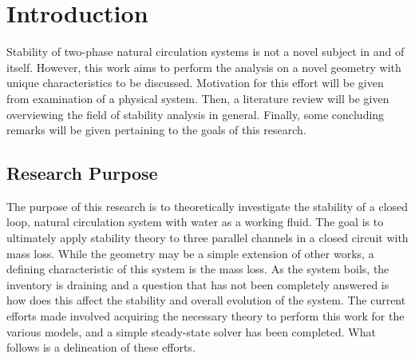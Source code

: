 \chapter{Introduction}

Stability of two-phase natural circulation systems is not a novel subject in and of itself.
However, this work aims to perform the analysis on a novel geometry with unique characteristics to be discussed.
Motivation for this effort will be given from examination of a physical system.
Then, a literature review will be given overviewing the field of stability analysis in general.
Finally, some concluding remarks will be given pertaining to the goals of this research.

\newpage
{}

\section{Research Purpose}\label{Section:Purpose}

The purpose of this research is to theoretically investigate the stability of a closed loop, natural circulation system with water as a working fluid.
The goal is to ultimately apply stability theory to three parallel channels in a closed circuit with mass loss.
While the geometry may be a simple extension of other works, a defining characteristic of this system is the mass loss.
As the system boils, the inventory is draining and a question that has not been completely answered is how does this affect the stability and overall evolution of the system.
The current efforts made involved acquiring the necessary theory to perform this work for the various models, and a simple steady-state solver has been completed.
What follows is a delineation of these efforts.





